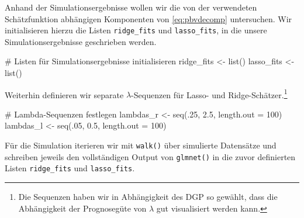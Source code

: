 \documentclass[
  a4paper,
  DIV=11,
  oneside]{scrreprt}
\newenvironment{Shaded}{\begin{snugshade}}{\end{snugshade}}
\newcommand{\AttributeTok}[1]{\textcolor[rgb]{0.40,0.45,0.13}{#1}}
\newcommand{\CommentTok}[1]{\textcolor[rgb]{0.37,0.37,0.37}{#1}}
\newcommand{\DecValTok}[1]{\textcolor[rgb]{0.68,0.00,0.00}{#1}}
\newcommand{\FloatTok}[1]{\textcolor[rgb]{0.68,0.00,0.00}{#1}}
\newcommand{\FunctionTok}[1]{\textcolor[rgb]{0.28,0.35,0.67}{#1}}
\newcommand{\NormalTok}[1]{\textcolor[rgb]{0.00,0.23,0.31}{#1}}
\newcommand{\OtherTok}[1]{\textcolor[rgb]{0.00,0.23,0.31}{#1}}
\begin{document}
Anhand der Simulationsergebnisse wollen wir die von der verwendeten
Schätzfunktion abhängigen Komponenten von \eqref{eq:pbvdecomp}
untersuchen. Wir initialisieren hierzu die Listen \texttt{ridge\_fits}
und \texttt{lasso\_fits}, in die unsere Simulationsergebnisse
geschrieben werden.

\begin{Shaded}
\begin{Highlighting}[]
\CommentTok{\# Listen für Simulationsergebnisse initialisieren}
\NormalTok{ridge\_fits }\OtherTok{\textless{}{-}} \FunctionTok{list}\NormalTok{()}
\NormalTok{lasso\_fits }\OtherTok{\textless{}{-}} \FunctionTok{list}\NormalTok{()}
\end{Highlighting}
\end{Shaded}

Weiterhin definieren wir separate \(\lambda\)-Sequenzen für Lasso- und
Ridge-Schätzer.\footnote{Die Sequenzen haben wir in Abhängigkeit des DGP
  so gewählt, dass die Abhängigkeit der Prognosegüte von \(\lambda\) gut
  visualisiert werden kann.}

\begin{Shaded}
\begin{Highlighting}[]
\CommentTok{\# Lambda{-}Sequenzen festlegen}
\NormalTok{lambdas\_r }\OtherTok{\textless{}{-}} \FunctionTok{seq}\NormalTok{(.}\DecValTok{25}\NormalTok{, }\FloatTok{2.5}\NormalTok{, }\AttributeTok{length.out =} \DecValTok{100}\NormalTok{)}
\NormalTok{lambdas\_l }\OtherTok{\textless{}{-}} \FunctionTok{seq}\NormalTok{(.}\DecValTok{05}\NormalTok{, }\FloatTok{0.5}\NormalTok{, }\AttributeTok{length.out =} \DecValTok{100}\NormalTok{)}
\end{Highlighting}
\end{Shaded}

Für die Simulation iterieren wir mit \texttt{walk()} über simulierte
Datensätze und schreiben jeweils den vollständigen Output von
\texttt{glmnet()} in die zuvor definierten Listen \texttt{ridge\_fits}
und \texttt{lasso\_fits}.
\end{document}
